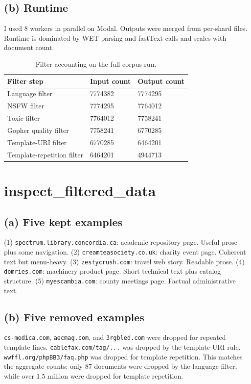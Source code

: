 \documentclass[11pt]{article}
\newcommand{\answer}[1]{#1}
\begin{document}
\subsection*{(b) Runtime}
\answer{I used 8 workers in parallel on Modal. Outputs were merged from per-shard files. Runtime is dominated by WET parsing and fastText calls and scales with document count.}
\begin{table}[H]
    \centering
    \begin{tabular}{lll}
        \toprule
        Filter step & Input count & Output count \\
        \midrule
        Language filter & 7774382 & 7774295 \\
        NSFW filter & 7774295 & 7764012 \\
        Toxic filter & 7764012 & 7758241 \\
        Gopher quality filter & 7758241 & 6770285 \\
        Template-URI filter & 6770285 & 6464201 \\
        Template-repetition filter & 6464201 & 4944713 \\
        \bottomrule
    \end{tabular}
    \caption{Filter accounting on the full corpus run.}
\end{table}

\section{inspect\_filtered\_data}
\subsection*{(a) Five kept examples}
\answer{(1) \texttt{spectrum.library.concordia.ca}: academic repository page. Useful prose plus some navigation. (2) \texttt{creamteasociety.co.uk}: charity event page. Coherent text but menu-heavy. (3) \texttt{zestycrush.com}: travel web story. Readable prose. (4) \texttt{domries.com}: machinery product page. Short technical text plus catalog structure. (5) \texttt{myescambia.com}: county meetings page. Factual administrative text.}

\subsection*{(b) Five removed examples}
\answer{\texttt{cs-medica.com}, \texttt{aecmag.com}, and \texttt{3rgbled.com} were dropped for repeated template lines. \texttt{cablefax.com/tag/...} was dropped by the template-URI rule. \texttt{wwffl.org/phpBB3/faq.php} was dropped for template repetition. This matches the aggregate counts: only 87 documents were dropped by the language filter, while over 1.5 million were dropped for template repetition.}
\end{document}
